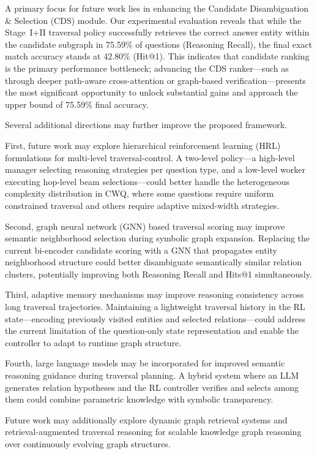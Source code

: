 \documentclass[10pt,conference]{IEEEtran}
\begin{document}
A primary focus for future work lies in enhancing the Candidate Disambiguation \& Selection (CDS) module. Our experimental evaluation reveals that while the Stage~I+II traversal policy successfully retrieves the correct answer entity within the candidate subgraph in 75.59\% of questions (Reasoning Recall), the final exact match accuracy stands at 42.80\% (Hit@1). This indicates that candidate ranking is the primary performance bottleneck; advancing the CDS ranker—such as through deeper path-aware cross-attention or graph-based verification—presents the most significant opportunity to unlock substantial gains and approach the upper bound of 75.59\% final accuracy.

Several additional directions may further improve the proposed framework.

First, future work may explore hierarchical reinforcement learning (HRL) formulations for multi-level traversal-control. A two-level policy---a high-level manager selecting reasoning strategies per question type, and a low-level worker executing hop-level beam selections---could better handle the heterogeneous complexity distribution in CWQ, where some questions require uniform constrained traversal and others require adaptive mixed-width strategies.

Second, graph neural network (GNN) based traversal scoring may improve semantic neighborhood selection during symbolic graph expansion. Replacing the current bi-encoder candidate scoring with a GNN that propagates entity neighborhood structure could better disambiguate semantically similar relation clusters, potentially improving both Reasoning Recall and Hits@1 simultaneously.

Third, adaptive memory mechanisms may improve reasoning consistency across long traversal trajectories. Maintaining a lightweight traversal history in the RL state---encoding previously visited entities and selected relations---could address the current limitation of the question-only state representation and enable the controller to adapt to runtime graph structure.

Fourth, large language models may be incorporated for improved semantic reasoning guidance during traversal planning. A hybrid system where an LLM generates relation hypotheses and the RL controller verifies and selects among them could combine parametric knowledge with symbolic transparency.

Future work may additionally explore dynamic graph retrieval systems and retrieval-augmented traversal reasoning for scalable knowledge graph reasoning over continuously evolving graph structures.
\end{document}
